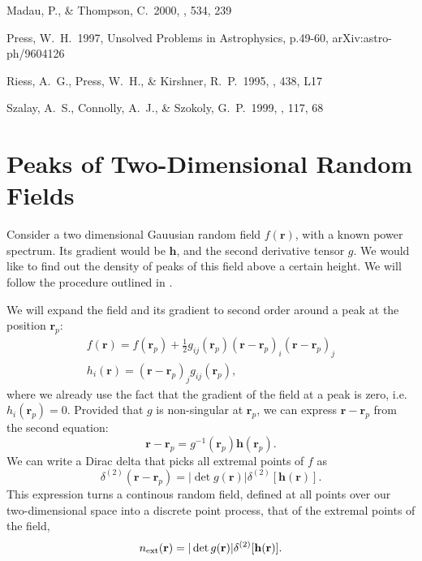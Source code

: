 \documentclass[twocolumn]{emulateapj}
\newcommand{\rr}{\mathbf{r}}
\newcommand{\hh}{\mathbf{h}}
\begin{document}
\begin{thebibliography}{}
 Madau, P., \& Thompson, C.\ 2000, \apj, 534, 239 

 Press, W.~H.\ 1997, Unsolved Problems in Astrophysics, p.49-60, arXiv:astro-ph/9604126

 Riess, A.~G., Press, W.~H., \& Kirshner, R.~P.\ 1995, \apjl, 438, L17 

 Szalay, A.~S., Connolly, A.~J., \& Szokoly, G.~P.\ 1999, \aj, 117, 68 





\end{thebibliography}


\appendix

\section{Peaks of Two-Dimensional Random Fields}
\noindent
Consider a two dimensional Gauusian random field $f(\rr)$, with a known power 
spectrum. Its gradient would be $\hh$, and the second derivative tensor $g$. 
We would like to find out the density of peaks of this field above a certain 
height. We will follow the procedure outlined in \citet{bbks}.

We will expand the field and its gradient to second order around a peak at the 
position $\rr_p$:
\begin{eqnarray}
	f(\rr) = f(\rr_p)+\frac{1}{2} g_{ij}(\rr_p) (\rr-\rr_p)_i  (\rr-\rr_p)_j\\
	h_i(\rr) = (\rr-\rr_p)_j g_{ij}(\rr_p),
\end{eqnarray}
where we already use the fact that the gradient of the field at a peak is zero, 
i.e. $h_i(\rr_p)=0$. Provided that $g$ is non-singular at $\rr_p$, we can express 
$\rr-\rr_p$ from the second equation:
\begin{equation}
	\rr-\rr_p = g^{-1}(\rr_p) \hh(\rr_p).
\end{equation}
We can write a Dirac delta that picks all extremal points of $f$ as
\begin{equation}
	\delta^{(2)}(\rr-\rr_p) = |\det g(\rr)| \delta^{(2)}[\hh(\rr)].
\end{equation}
This expression turns a continous random field, defined at all points over our 
two-dimensional space into a discrete point process, that of the extremal points 
of the field,
\begin{equation}
	n_{\rm{}ext}(\rr) = |\det g(\rr)| \delta^{(2)}[\hh(\rr)].
\end{equation}
\end{document}
